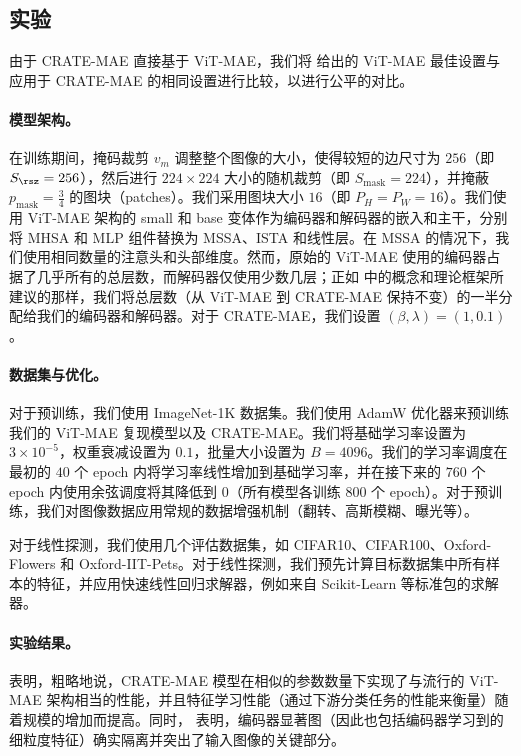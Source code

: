 \documentclass[../../book-main_zh.tex]{subfiles}
\begin{document}
\subsection{实验}\label{sub:image_completion_experiments}

由于 CRATE-MAE 直接基于 ViT-MAE，我们将 \citep{he2022masked} 给出的 ViT-MAE 最佳设置与应用于 CRATE-MAE 的相同设置进行比较，以进行公平的对比。

\paragraph{模型架构。} 在训练期间，掩码裁剪 \(v_{m}\) 调整整个图像的大小，使得较短的边尺寸为 \(256\)（即 \(S_{\rsz} = 256\)），然后进行 \(224 \times 224\) 大小的随机裁剪（即 \(S_{\mathrm{mask}} = 224\)），并掩蔽 \(p_{\mathrm{mask}} = \frac{3}{4}\) 的图块（patches）。我们采用图块大小 \(16\)（即 \(P_{H} = P_{W} = 16\)）。我们使用 ViT-MAE 架构的 small 和 base 变体作为编码器和解码器的嵌入和主干，分别将 MHSA 和 MLP 组件替换为 MSSA、ISTA 和线性层。在 MSSA 的情况下，我们使用相同数量的注意头和头部维度。然而，原始的 ViT-MAE 使用的编码器占据了几乎所有的总层数，而解码器仅使用少数几层；正如  中的概念和理论框架所建议的那样，我们将总层数（从 ViT-MAE 到 CRATE-MAE 保持不变）的一半分配给我们的编码器和解码器。对于 CRATE-MAE，我们设置 \((\beta, \lambda) = (1, 0.1)\)。

\paragraph{数据集与优化。} 对于预训练，我们使用 ImageNet-1K 数据集。我们使用 AdamW 优化器来预训练我们的 ViT-MAE 复现模型以及 CRATE-MAE。我们将基础学习率设置为 \(3 \times 10^{-5}\)，权重衰减设置为 \(0.1\)，批量大小设置为 \(B = 4096\)。我们的学习率调度在最初的 \(40\) 个 epoch 内将学习率线性增加到基础学习率，并在接下来的 \(760\) 个 epoch 内使用余弦调度将其降低到 \(0\)（所有模型各训练 \(800\) 个 epoch）。对于预训练，我们对图像数据应用常规的数据增强机制（翻转、高斯模糊、曝光等）。

对于线性探测，我们使用几个评估数据集，如 CIFAR10、CIFAR100、Oxford-Flowers 和 Oxford-IIT-Pets。对于线性探测，我们预先计算目标数据集中所有样本的特征，并应用快速线性回归求解器，例如来自 Scikit-Learn 等标准包的求解器。

\paragraph{实验结果。}  表明，粗略地说，CRATE-MAE 模型在相似的参数数量下实现了与流行的 ViT-MAE 架构相当的性能，并且特征学习性能（通过下游分类任务的性能来衡量）随着规模的增加而提高。同时， 表明，编码器显著图（因此也包括编码器学习到的细粒度特征）确实隔离并突出了输入图像的关键部分。
\end{document}
